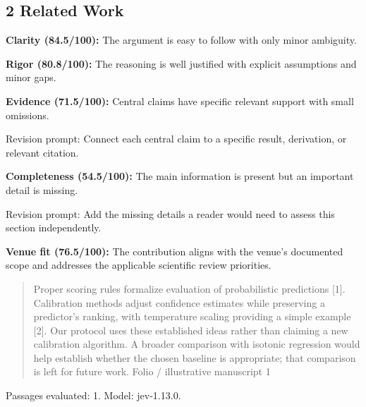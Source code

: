 \documentclass[11pt]{article}
\begin{document}
\subsection{2 Related Work}
\par\textbf{Clarity (84.5/100):} The argument is easy to follow with only minor ambiguity.
\par\textbf{Rigor (80.8/100):} The reasoning is well justified with explicit assumptions and minor gaps.
\par\textbf{Evidence (71.5/100):} Central claims have specific relevant support with small omissions.
\par Revision prompt: Connect each central claim to a specific result, derivation, or relevant citation.
\par\textbf{Completeness (54.5/100):} The main information is present but an important detail is missing.
\par Revision prompt: Add the missing details a reader would need to assess this section independently.
\par\textbf{Venue fit (76.5/100):} The contribution aligns with the venue's documented scope and addresses the applicable scientific review priorities.
\begin{quote}\small Proper scoring rules formalize evaluation of probabilistic predictions [1]. Calibration methods adjust
confidence estimates while preserving a predictor's ranking, with temperature scaling providing a simple
example [2]. Our protocol uses these established ideas rather than claiming a new calibration algorithm.
A broader comparison with isotonic regression would help establish whether the chosen baseline is
appropriate; that comparison is left for future work.
Folio / illustrative manuscript                                      1\end{quote}
Passages evaluated: 1. Model: jev-1.13.0.
\end{document}
